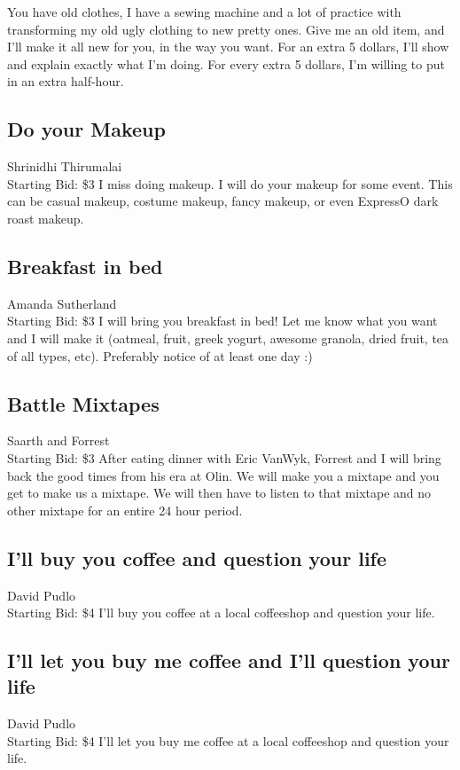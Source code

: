 \documentclass[11pt]{article}
\begin{document}
You have old clothes, I have a sewing machine and a lot of practice with transforming my old ugly clothing to new pretty ones. Give me an old item, and I'll make it all new for you, in the way you want. For an extra 5 dollars, I'll show and explain exactly what I'm doing. For every extra 5 dollars, I'm willing to put in an extra half-hour.
\subsection{Do your Makeup}
Shrinidhi Thirumalai
\\
Starting Bid: \$3
\newline
I miss doing makeup. I will do your makeup for some event. This can be casual makeup, costume makeup, fancy makeup, or even ExpressO dark roast makeup.
\subsection{Breakfast in bed}
Amanda Sutherland
\\
Starting Bid: \$3
\newline
I will bring you breakfast in bed! Let me know what you want and I will make it (oatmeal, fruit, greek yogurt, awesome granola, dried fruit, tea of all types, etc). Preferably notice of at least one day :)
\subsection{Battle Mixtapes}
Saarth and Forrest
\\
Starting Bid: \$3
\newline
After eating dinner with Eric VanWyk, Forrest and I will bring back the good times from his era at Olin. We will make you a mixtape and you get to make us a mixtape. We will then have to listen to that mixtape and no other mixtape for an entire 24 hour period.
\subsection{I'll buy you coffee and question your life}
David Pudlo
\\
Starting Bid: \$4
\newline
I'll buy you coffee at a local coffeeshop and question your life.
\subsection{I'll let you buy me coffee and I'll question your life}
David Pudlo
\\
Starting Bid: \$4
\newline
I'll let you buy me coffee at a local coffeeshop and question your life.
\end{document}
